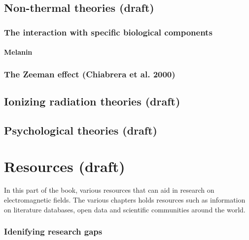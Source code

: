 \documentclass[
  letterpaper,
  DIV=11,
  numbers=noendperiod]{scrreprt}
\begin{document}
\hypertarget{non-thermal-theories-draft}{%
\chapter{Non-thermal theories
(draft)}\label{non-thermal-theories-draft}}

\hypertarget{the-interaction-with-specific-biological-components}{%
\section{The interaction with specific biological
components}\label{the-interaction-with-specific-biological-components}}

\hypertarget{melanin}{%
\subsection{Melanin}\label{melanin}}

\hypertarget{the-zeeman-effect-chiabrerazeemanstarkmodelingrf2000}{%
\section{The Zeeman effect (Chiabrera et al.
2000)}\label{the-zeeman-effect-chiabrerazeemanstarkmodelingrf2000}}

\hypertarget{ionizing-radiation-theories-draft}{%
\chapter{Ionizing radiation theories
(draft)}\label{ionizing-radiation-theories-draft}}

\hypertarget{psychological-theories-draft}{%
\chapter{Psychological theories
(draft)}\label{psychological-theories-draft}}

\part{Resources (draft)}

In this part of the book, various resources that can aid in research on
electromagnetic fields. The various chapters holds resources such as
information on literature databases, open data and scientific
communities around the world.

\hypertarget{idenifying-research-gaps}{%
\section*{Idenifying research gaps}\label{idenifying-research-gaps}}
\end{document}
